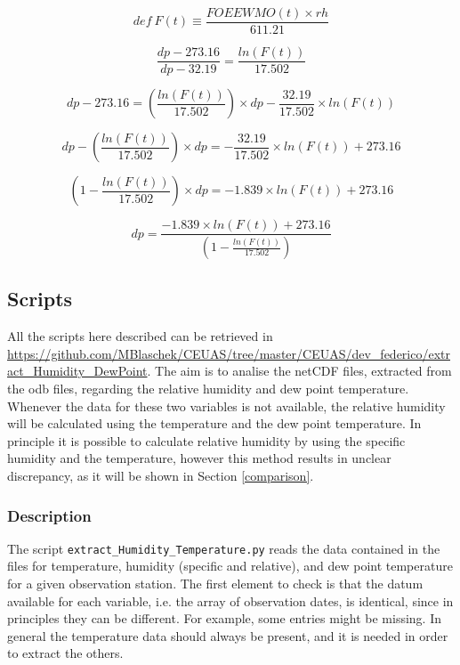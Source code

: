 \documentclass[a4paper,11pt]{article}
\begin{document}
\begin{equation*}
def \ F(t) \equiv \frac{FOEEWMO(t) \times rh}{611.21}
\end{equation*}


\begin{equation*}
 \frac{dp - 273.16}{dp-32.19} = \frac{ln \left( F(t) \right)}{17.502}   
\end{equation*}

\begin{equation*}
dp - 273.16 = \left(\frac{ln \left(  F(t) \right)}{17.502}   \right) \times dp - \frac{32.19}{17.502} \times ln \left(  F(t) \right)
\end{equation*} 

\begin{equation*}
dp - \left(\frac{ln \left(  F(t) \right)}{17.502}   \right) \times dp  = - \frac{32.19}{17.502} \times ln \left(  F(t) \right) + 273.16
\end{equation*} 


\begin{equation*}
\left (  1 - \frac{ ln \left(  F(t)  \right)}{17.502} \right) \times dp = - 1.839 \times ln \left(   F(t)    \right) + 273.16 
\end{equation*} 




\begin{equation}
dp =  \frac{ - 1.839 \times ln \left(   F(t)    \right) + 273.16 }{\left (  1 - \frac{ ln \left(  F(t)  \right)}{17.502} \right)}
\end{equation}


\subsection{Scripts}
All the scripts here described can be retrieved in \url{https://github.com/MBlaschek/CEUAS/tree/master/CEUAS/dev_federico/extract_Humidity_DewPoint}.
The aim is to analise the netCDF files, extracted from the odb files, regarding the relative humidity and dew point temperature. Whenever the data for these two variables is not available, the relative humidity will be calculated using the temperature and the dew point temperature. In principle it is possible to calculate relative humidity by using the specific humidity and the temperature, however this method results in unclear discrepancy, as it will be shown in Section \ref{comparison}.

\subsubsection{Description}
The script \verb|extract_Humidity_Temperature.py| reads the data contained in the files for temperature, humidity (specific and relative), and dew point temperature for a given observation station. The first element to check is that the datum available for each variable, i.e. the array of observation dates, is identical, since in principles they can be different. For example, some entries might be missing. In general the temperature data should always be present, and it is needed in order to extract the others. 
\\
\end{document}
